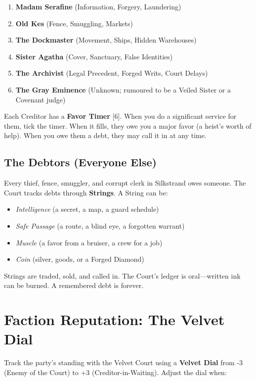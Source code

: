 \documentclass[10pt,twoside]{book}
\begin{document}
\begin{enumerate}
\item \textbf{Madam Serafine} (Information, Forgery, Laundering)
\item \textbf{Old Kes} (Fence, Smuggling, Markets)
\item \textbf{The Dockmaster} (Movement, Ships, Hidden Warehouses)
\item \textbf{Sister Agatha} (Cover, Sanctuary, False Identities)
\item \textbf{The Archivist} (Legal Precedent, Forged Writs, Court Delays)
\item \textbf{The Gray Eminence} (Unknown; rumoured to be a Veiled Sister or a Covenant judge)
\end{enumerate}

Each Creditor has a \textbf{Favor Timer } [6]. When you do a significant service for them, tick the timer. When it fills, they owe you a major favor (a heist's worth of help). When you owe them a debt, they may call it in at any time.

\subsection{The Debtors (Everyone Else)}

Every thief, fence, smuggler, and corrupt clerk in Silkstrand owes someone. The Court tracks debts through \textbf{Strings}. A String can be:

\begin{itemize}
\item \textit{Intelligence} (a secret, a map, a guard schedule)
\item \textit{Safe Passage} (a route, a blind eye, a forgotten warrant)
\item \textit{Muscle} (a favor from a bruiser, a crew for a job)
\item \textit{Coin} (silver, goods, or a Forged Diamond)
\end{itemize}

Strings are traded, sold, and called in. The Court's ledger is oral---written ink can be burned. A remembered debt is forever.

\section{Faction Reputation: The Velvet Dial}

Track the party's standing with the Velvet Court using a \textbf{Velvet Dial} from -3 (Enemy of the Court) to +3 (Creditor-in-Waiting). Adjust the dial when:
\end{document}
